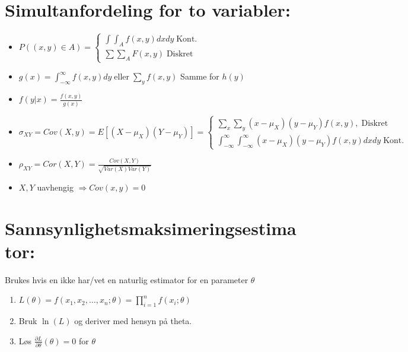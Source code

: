 \documentclass[12pt,a4paper,twocolumn,twoside]{article}
\def\parder#1#2#3{\frac{\partial #1}{\partial #2}\left( #3 \right)}
\begin{document}
\section*{Simultanfordeling for to variabler:}
\begin{itemize}[topsep=0pt,itemsep=0pt, partopsep=0pt]
    \item $P((x,y)\in A)=\begin{cases}
        \int\int_A f(x,y)dxdy\;\text{Kont.}\\
        \sum\sum_A F(x,y)\;\text{Diskret}
    \end{cases}$
    \item $g(x)=\int_{-\infty}^\infty f(x,y)dy\;\text{eller}\;\sum_yf(x,y)$ Samme for $h(y)$
    \item $f(y|x)=\frac{f(x,y)}{g(x)}$
    \item $\sigma_{XY}=Cov(X,y)=E[(X-\mu_X)(Y-\mu_Y)]=\begin{cases}
        \sum_x\sum_y(x-\mu_X)(y-\mu_Y)f(x,y),\;\text{Diskret}\\
        \int_{-\infty}^\infty\int_{-\infty}^\infty (x-\mu_X)(y-\mu_Y)f(x,y)dxdy\;\text{Kont.}
    \end{cases}$
    \item $\rho_{XY}=Cor(X,Y)=\frac{Cov(X,Y)}{\sqrt{Var(X)Var(Y)}}$
    \item $X,Y$ uavhengig $\Rightarrow Cov(x,y)=0$
\end{itemize}
%
%
\section*{Sannsynlighetsmaksimeringsestimator:}
Brukes hvis en ikke har/vet en naturlig estimator for en parameter $\theta$
\begin{enumerate}[topsep=0pt,itemsep=0pt, partopsep=0pt]
    \item $L(\theta)=f(x_1,x_2,\dots,x_n;\theta)=\prod_{i=1}^nf(x_i;\theta)$
    \item Bruk $\ln(L)$ og deriver med hensyn på theta.
    \item Løs $\parder{L}{\theta}{\theta} = 0$ for $\theta$
\end{enumerate}
\end{document}
